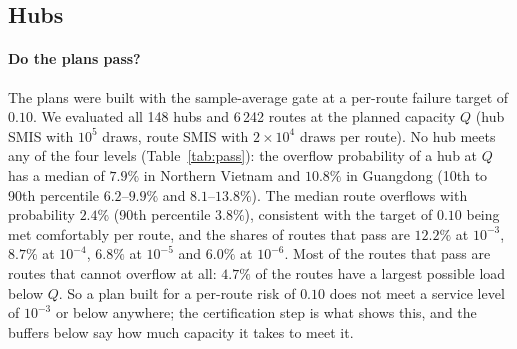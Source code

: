 \documentclass[11pt]{article}
\theoremstyle{definition}
\theoremstyle{remark}
\begin{document}
\subsection{Hubs}
\label{sec:hubs}
\paragraph{Do the plans pass?} The plans were built with the sample-average
gate at a per-route failure target of $0.10$. We evaluated all 148 hubs and
6\,242 routes at the planned capacity $Q$ (hub SMIS with $10^5$ draws, route
SMIS with $2\times10^4$ draws per route). No hub meets any of the four levels
(Table~\ref{tab:pass}): the overflow probability of a hub at $Q$ has a median
of $7.9\%$ in Northern Vietnam and $10.8\%$ in Guangdong (10th to 90th
percentile $6.2$--$9.9\%$ and $8.1$--$13.8\%$). The median route overflows
with probability $2.4\%$ (90th percentile $3.8\%$), consistent with the
target of $0.10$ being met comfortably per route, and the shares of routes that
pass are $12.2\%$ at $10^{-3}$, $8.7\%$ at $10^{-4}$, $6.8\%$ at $10^{-5}$ and
$6.0\%$ at $10^{-6}$. Most of the routes that pass are routes that cannot
overflow at all: $4.7\%$ of the routes have a largest possible load below $Q$.
So a plan built for a per-route risk of $0.10$ does not meet a service level of
$10^{-3}$ or below anywhere; the certification step is what shows this, and
the buffers below say how much capacity it takes to meet it.

\begin{table}[t]
\centering\small
\caption{Plans at their planned capacity $Q$: share of routes with overflow
probability at most $\gamma$ (route SMIS), and the overflow probability of a
hub, by region (148 hubs, 6\,242 routes). No hub passes at any $\gamma$.}
\label{tab:pass}
\end{table}
\end{document}
